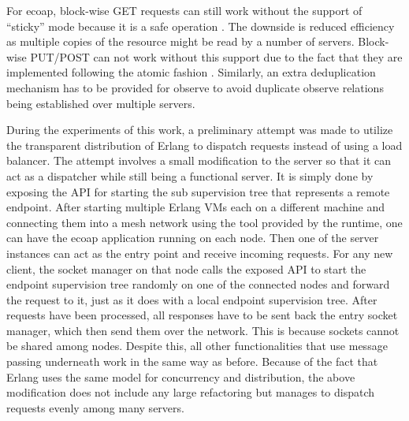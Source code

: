 For ecoap, block-wise GET requests can still work without the support of ``sticky'' mode because it is a safe operation \autocite{coap_protocol}. The downside is reduced efficiency as multiple copies of the resource might be read by a number of servers. Block-wise PUT/POST can not work without this support due to the fact that they are implemented following the atomic fashion \autocite{blockwise}. Similarly, an extra deduplication mechanism has to be provided for observe to avoid duplicate observe relations being established over multiple servers. 

During the experiments of this work, a preliminary attempt was made to utilize the transparent distribution of Erlang to dispatch requests instead of using a load balancer. The attempt involves a small modification to the server so that it can act as a dispatcher while still being a functional server. It is simply done by exposing the API for starting the sub supervision tree that represents a remote endpoint. After starting multiple Erlang VMs each on a different machine and connecting them into a mesh network using the tool provided by the runtime, one can have the ecoap application running on each node. Then one of the server instances can act as the entry point and receive incoming requests. For any new client, the socket manager on that node calls the exposed API to start the endpoint supervision tree randomly on one of the connected nodes and forward the request to it, just as it does with a local endpoint supervision tree. After requests have been processed, all responses have to be sent back the entry socket manager, which then send them over the network. This is because sockets cannot be shared among nodes. Despite this, all other functionalities that use message passing underneath work in the same way as before. Because of the fact that Erlang uses the same model for concurrency and distribution,
the above modification does not include any large refactoring but manages to dispatch requests evenly among many servers.

